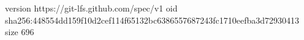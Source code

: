version https://git-lfs.github.com/spec/v1
oid sha256:448554dd159f10d2cef114f65132bc6386557687243fc1710eefba3d72930413
size 696
